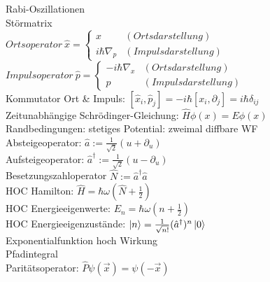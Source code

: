 \documentclass{article}
\begin{document}
Rabi-Oszillationen \\

St\"ormatrix \\

$Ortsoperator\ \hat{x}=\left\{\begin{array}{ll} 
x & (Ortsdarstellung) \\
i \hbar \nabla_p & (Impulsdarstellung)
\end{array}\right.$ \\

$Impulsoperator\ \hat{p}=\left\{\begin{array}{ll}  
- i \hbar \nabla_x & (Ortsdarstellung) \\
p & (Impulsdarstellung)
\end{array}\right.$ \\

Kommutator Ort \& Impuls: $[ \hat{x}_i, \hat{p}_j] = - i \hbar \left[x_i, \partial_j\right] = i \hbar \delta_{ij}$ \\

Zeitunabh\"angige Schr\"odinger-Gleichung: $\hat{H}\phi(x) = E \phi(x)$ \\

Randbedingungen: stetiges Potential: zweimal diffbare WF \\

Absteigeoperator: $\hat{a} := \frac{1}{\sqrt{2}} (u + \partial_u)$ \\

Aufsteigeoperator: $\hat{a}^{\dagger} := \frac{1}{\sqrt{2}} (u - \partial_u)$ \\

Besetzungszahloperator $\hat{N} := \hat{a}^{\dagger} \hat{a} $ \\

HOC Hamilton: $ \hat{H} = \hbar \omega \left( \hat{N} + \frac{1}{2} \right) $ \\

HOC Energieeigenwerte: $ E_n = \hbar \omega \left( n + \frac{1}{2} \right)$\\

HOC Energieeigenzust\"ande: $\ket{n} = \frac{1}{\sqrt{n!}}(\hat{a}^{\dagger})^n \ket{0}$ \\

Exponentialfunktion hoch Wirkung \\

Pfadintegral \\

Parit\"atsoperator: $\hat{P}\psi(\vec{x}) = \psi(-\vec{x}) $ \\
\end{document}
